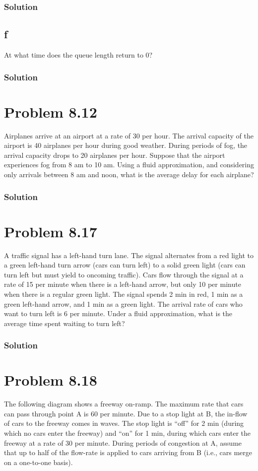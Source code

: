 \documentclass[letterpaper]{amsart}
\begin{document}
\subsubsection*{Solution}
\subsection*{f}
At what time does the queue length return to 0?
\subsubsection*{Solution}

\section{Problem 8.12} %
Airplanes arrive at an airport at a rate of 30 per hour. The arrival capacity
of the airport is 40 airplanes per hour during good weather. During periods
of fog, the arrival capacity drops to 20 airplanes per hour. Suppose that the
airport experiences fog from 8 am to 10 am. Using a fluid approximation,
and considering only arrivals between 8 am and noon, what is the average
delay for each airplane?
\subsubsection*{Solution}

\section{Problem 8.17} %
A traffic signal has a left-hand turn lane. The signal alternates from a red
light to a green left-hand turn arrow (cars can turn left) to a solid green light
(cars can turn left but must yield to oncoming traffic). Cars flow through
the signal at a rate of 15 per minute when there is a left-hand arrow, but
only 10 per minute when there is a regular green light. The signal spends
2 min in red, 1 min as a green left-hand arrow, and 1 min as a green light.
The arrival rate of cars who want to turn left is 6 per minute. Under a fluid
approximation, what is the average time spent waiting to turn left?
\subsubsection*{Solution}

\section{Problem 8.18} %
The following diagram shows a freeway on-ramp. The maximum rate that
cars can pass through point A is 60 per minute. Due to a stop light at B, the
in-flow of cars to the freeway comes in waves. The stop light is “off” for
2 min (during which no cars enter the freeway) and “on” for 1 min, during
which cars enter the freeway at a rate of 30 per minute. During periods of
congestion at A, assume that up to half of the flow-rate is applied to cars
arriving from B (i.e., cars merge on a one-to-one basis).
\end{document}
